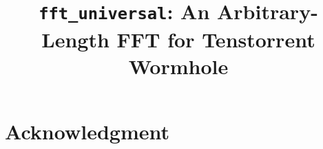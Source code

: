 \documentclass[conference]{IEEEtran}
\title{%
  \texttt{fft\_universal}: An Arbitrary-Length FFT for
  Tenstorrent Wormhole
}
\author{%
  \IEEEauthorblockN{Pranav Korhale\IEEEauthorrefmark{1}}
  \IEEEauthorblockA{\IEEEauthorrefmark{1}Tenstorrent Inc., %
  \\
  \texttt{\{pkorhale\}@tenstorrent.com}}
}
\begin{document}
\maketitle

\begin{abstract}

\end{abstract}

\IEEEpeerreviewmaketitle









\section*{Acknowledgment}



\end{document}
